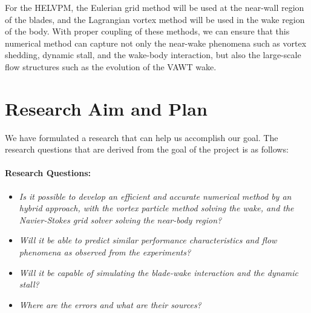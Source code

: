 For the HELVPM, the Eulerian grid method will be used at the near-wall region of the blades, and the Lagrangian vortex method will be used in the wake region of the body. With proper coupling of these methods, we can ensure that this numerical method can capture not only the near-wake phenomena such as vortex shedding, dynamic stall, and the wake-body interaction, but also the large-scale flow structures such as the evolution of the VAWT wake.

\section{Research Aim and Plan}

We have formulated a research that can help us accomplish our goal. The research questions that are derived from the goal of the project is as follows:

\paragraph*{Research Questions:}
	\begin{itemize}
	\item \textit{Is it possible to develop an efficient and accurate numerical method by an
	hybrid approach, with the vortex particle method solving the wake, and the Navier-Stokes grid solver solving the near-body region?}
	
	\item \textit{Will it be able to predict similar performance characteristics and flow phenomena as observed from the experiments?}
	
	\item \textit{Will it be capable of simulating the blade-wake interaction and the dynamic stall?}
	
	\item \textit{Where are the errors and what are their sources?}
	\end{itemize}

